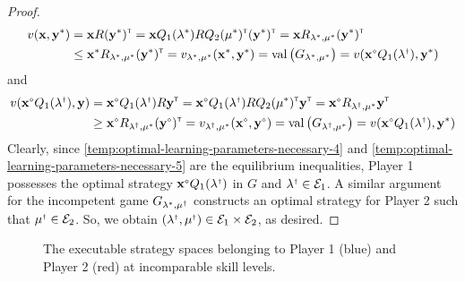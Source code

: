 \begin{proof}
\begin{equation}
\begin{split}
            v(\vec{x}, \vec{y}^*)
                & = \vec{x} R (\vec{y}^*)^\transp
                = \vec{x} Q_1(\lambda^*) R Q_2(\mu^*)^\transp (\vec{y}^*)^\transp
                = \vec{x} R_{\lambda^*, \mu^*} (\vec{y}^*)^\transp \\
                & \le \vec{x}^* R_{\lambda^*, \mu^*} (\vec{y}^*)^\transp
                = v_{\lambda^*, \mu^*} (\vec{x}^*, \vec{y}^*)
                = \val\big(G_{\lambda^*, \mu^*}\big)
                = v(\vec{x}^\sdiamond Q_1(\lambda^\sdagger), \vec{y}^*)
        \end{split}
        \end{equation}
        and
        \begin{equation} \label{temp:optimal-learning-parameters-necessary-5}
        \begin{split}
            v(\vec{x}^\sdiamond Q_1(\lambda^\sdagger), \vec{y})
                & = \vec{x}^\sdiamond Q_1(\lambda^\sdagger) R \vec{y}^\transp
                = \vec{x}^\sdiamond Q_1(\lambda^\sdagger) R Q_2(\mu^*)^\transp \vec{y}^\transp
                = \vec{x}^\sdiamond R_{\lambda^\sdagger, \mu^*} \vec{y}^\transp \\
                & \ge \vec{x}^\sdiamond R_{\lambda^\sdagger, \mu^*} (\vec{y}^\sdiamond)^\transp
                = v_{\lambda^\sdagger, \mu^*}(\vec{x}^\sdiamond, \vec{y}^\sdiamond)
                = \val\big(G_{\lambda^\sdagger, \mu^*}\big)
                = v(\vec{x}^\sdiamond Q_1(\lambda^\sdagger), \vec{y}^*)
        \end{split}
        \end{equation}
        Clearly, since \eqref{temp:optimal-learning-parameters-necessary-4} and \eqref{temp:optimal-learning-parameters-necessary-5} are the equilibrium inequalities, Player 1 possesses the optimal strategy $\vec{x}^\sdiamond Q_1(\lambda^\sdagger)$ in $G$ and $\lambda^\sdagger \in \scrE_1$.
        A similar argument for the incompetent game $G_{\lambda^*, \mu^\sdagger}$ constructs an optimal strategy for Player 2 such that $\mu^\sdagger \in \scrE_2$.
        So, we obtain $(\lambda^\sdagger, \mu^\sdagger) \in \scrE_1 \times \scrE_2$, as desired.
    \end{proof}

    \begin{figure}[t]
        \centering
        
        \caption[Learning Trajectories with Incomparable Skill Levels]{The executable strategy spaces belonging to Player 1 (blue) and Player 2 (red) at incomparable skill levels.}
        \label{fig:incomparable-skill}
    \end{figure}

